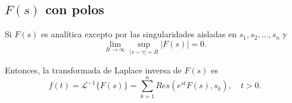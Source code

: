





\subsection{\texorpdfstring{$F(s)$}{TEXT} con polos}

\begin{teorema}
    Si $F(s)$ es analítica excepto por las singularidades aisladas en $s_1, s_2, \dots, s_n$ y 
    $$\lim_{R \to \infty} \sup_{ |s - \gamma| = R} |F(s)| =  0.$$
   
   Entonces, la transformada de Laplace inversa de $F(s)$ es
    $$f(t) = \mathcal{L}^{-1}\{F(s)\} = \sum_{k= 1}^n Res(e^{st} F(s), s_k), \quad t > 0.$$
\end{teorema}

